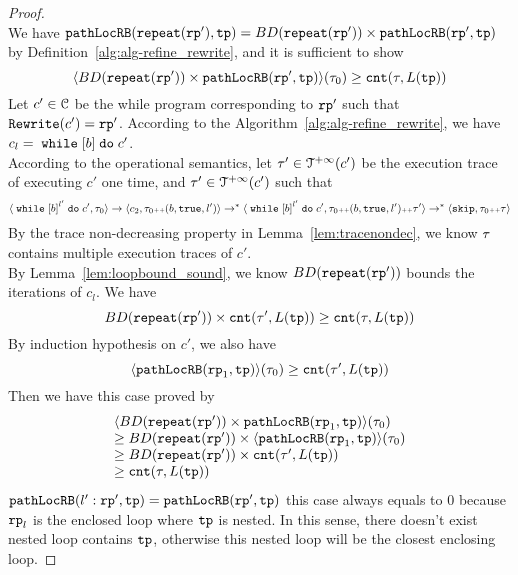 \begin{proof}
\\
We have $\mathtt{pathLocRB}(\mathtt{repeat}(\mathtt{rp}'), \mathtt{tp}) = BD(\mathtt{repeat}(\mathtt{rp}')) \times \mathtt{pathLocRB}(\mathtt{rp}', \mathtt{tp})$
by Definition~\ref{alg:alg-refine_rewrite}, and
it is sufficient to show
\[
  \langle  BD(\mathtt{repeat}(\mathtt{rp}')) \times \mathtt{pathLocRB}(\mathtt{rp}', \mathtt{tp}) \rangle (\mathtt{\tau}_0) \geq \mathtt{cnt}(\mathtt{\tau}, L(\mathtt{tp})) 
\]
Let $c' \in \mathcal{C}$ be the while program corresponding to $\mathtt{rp}'$ such that $\mathtt{Rewrite}(c') = \mathtt{rp}'$.
According to the Algorithm~\ref{alg:alg-refine_rewrite}, we have $c_l = \ewhile \clabel{\bexpr} \edo c'$.
\\
According to the operational semantics, let $\mathtt{\tau}' \in \mathcal{T}^{+\infty}(c')$ be the execution trace of executing $c'$ one time,
and $\mathtt{\tau}' \in \mathcal{T}^{+\infty}(c')$  such that 
\[
  \config{\ewhile \clabel{\bexpr}^{l'} \edo c', \trace_0} \to \config{c_2, \trace_0 \tracecat (\bexpr, \etrue, l')} \to^* \config{\ewhile \clabel{\bexpr}^{l'} \edo c', \trace_0 \tracecat (\bexpr, \etrue, l') \tracecat \trace'}
  \to^* \config{\eskip, \trace_0 \tracecat \trace}
\]
By the trace non-decreasing property in Lemma~\ref{lem:tracenondec}, we know $\mathtt{\tau}$ contains multiple execution traces of $c'$.
\\
By Lemma~\ref{lem:loopbound_sound}, we know $BD(\mathtt{repeat}(\mathtt{rp}'))$ bounds the iterations of $c_l$. We have
\[
  BD(\mathtt{repeat}(\mathtt{rp}')) \times \mathtt{cnt}(\mathtt{\tau}', L(\mathtt{tp}))  \geq \mathtt{cnt}(\mathtt{\tau}, L(\mathtt{tp})) 
\]
By induction hypothesis on $c'$, we also have
\[
  \langle \mathtt{pathLocRB}(\mathtt{rp}_1, \mathtt{tp}) \rangle(\mathtt{\tau}_0) \geq \mathtt{cnt}(\mathtt{\tau}', L(\mathtt{tp})) 
\]
Then we have this case proved by
\[
  \begin{array}{l}
  \langle BD(\mathtt{repeat}(\mathtt{rp}')) \times \mathtt{pathLocRB}(\mathtt{rp}_1, \mathtt{tp}) \rangle(\mathtt{\tau}_0) 
  \\
  \geq
  BD(\mathtt{repeat}(\mathtt{rp}')) \times \langle \mathtt{pathLocRB}(\mathtt{rp}_1, \mathtt{tp}) \rangle(\mathtt{\tau}_0) 
  \\
  \geq BD(\mathtt{repeat}(\mathtt{rp}')) \times \mathtt{cnt}(\mathtt{\tau}', L(\mathtt{tp}))  
  \\
  \geq \mathtt{cnt}(\mathtt{\tau}, L(\mathtt{tp})) 
  \end{array}
  \]
$\mathtt{pathLocRB}(l': \mathtt{rp}', \mathtt{tp}) = \mathtt{pathLocRB}(\mathtt{rp}', \mathtt{tp})$ 
this case always equals to $0$ because $\mathtt{rp}_l$ is the enclosed loop where $\mathtt{tp}$ is nested. In this sense, there doesn't exist nested loop contains $\mathtt{tp}$, otherwise this nested loop will be the closest enclosing loop.

\end{proof}